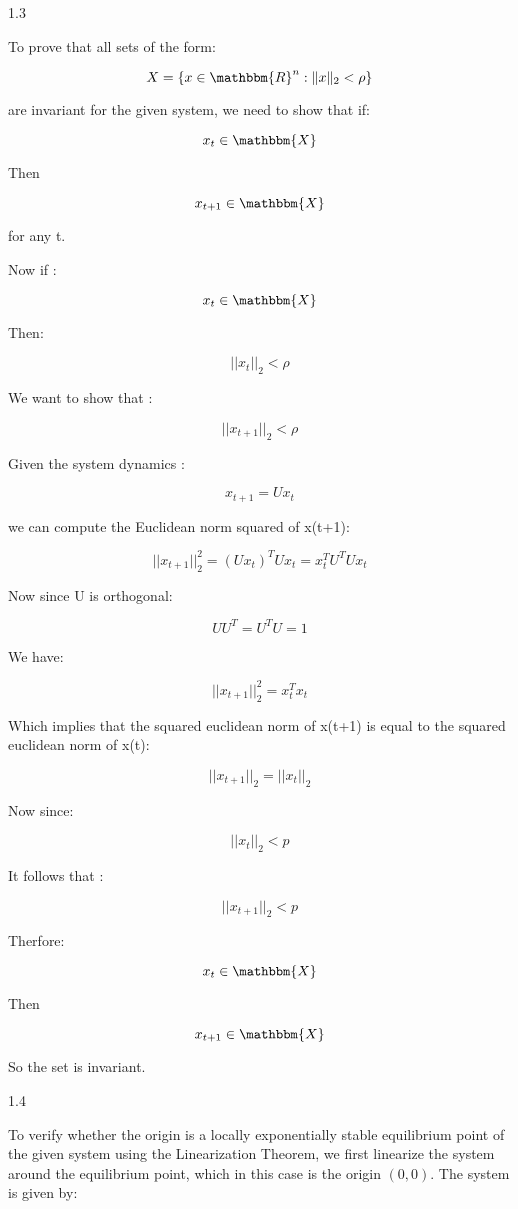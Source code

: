 \documentclass{article}
\begin{document}
1.3

To prove that all sets of the form:

\[ X = \{x \in \mathbbm{R}^n : \lVert x \rVert_2 < \rho\} \]

 
 are invariant for the given system, we need to show that if:
 
 \[ x_t \in \mathbbm{X} \] 
 
 Then 
 
\[ x_{t+1} \in \mathbbm{X} \]

for any t.

Now if :

 \[ x_t \in \mathbbm{X} \] 
 
 Then:
 
 \[ ||x_t||_2 < \rho \]
 
 We want to show that :
 
 \[ ||x_{t+1} ||_2 < \rho \]
 
 Given the system dynamics :
 
 \[ x_{t+1} = Ux_t \]
 
 we can compute the Euclidean norm squared of x(t+1):
 
 \[ ||x_{t+1}||_2^2 = (Ux_t)^TUx_t = x_t^TU^TUx_t \]
 
 Now since U is orthogonal:
 
 \[ UU^T = U^TU = 1 \] 
 
 We have:
 
 \[ ||x_{t+1} ||_2^2 = x_t^Tx_t \]
 
 Which implies that the squared euclidean norm of x(t+1) is equal to the squared euclidean norm of x(t):
 
 \[ || x_{t+1} ||_2 = ||x_t||_2 \]
 
 Now since:
 
 \[ ||x_t||_2 < p \]
 
 It follows that :
 
 \[ ||x_{t+1}||_2 < p \]
 
 Therfore:
 
 \[ x_t \in \mathbbm{X} \]
 
 Then
 
 \[ x_{t+1} \in \mathbbm{X} \]
 
 So the set is invariant.
 
 1.4 
 
 To verify whether the origin is a locally exponentially stable equilibrium point of the given system using the Linearization Theorem, we first linearize the system around the equilibrium point, which in this case is the origin \((0, 0)\). The system is given by:
\end{document}
